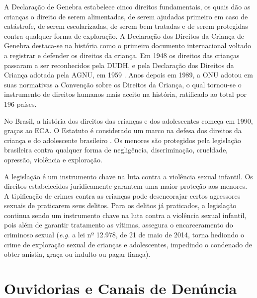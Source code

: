 A Declaração de Genebra estabelece cinco direitos fundamentais, os quais dão as crianças o direito de serem alimentadas, de serem ajudadas primeiro em caso de catástrofe, de serem escolarizadas, de serem bem tratadas e de serem protegidas contra qualquer forma de exploração. A Declaração dos Direitos da Criança de Genebra destaca-se na história como o primeiro documento internacional voltado a registrar e defender os direitos da criança. Em 1948 os direitos das crianças passaram a ser reconhecidos pela \ac{DUDH}, e pela Declaração dos Direitos da Criança adotada pela \ac{AGNU}, em 1959 \cite{lelis2014fragmentaccao}. Anos depois em 1989, a \ac{ONU} adotou em suas normativas a Convenção sobre os Direitos da Criança, o qual tornou-se o instrumento de direitos humanos mais aceito na história, ratificado ao total por 196 países. 

No Brasil, a história dos direitos das crianças e dos adolescentes começa em 1990, graças ao \acf{ECA}. O Estatuto é considerado um marco na defesa dos direitos da criança e do adolescente brasileiro \cite{lima2012direitos}. Os menores são protegidos pela legislação brasileira contra qualquer forma de negligência, discriminação, crueldade, opressão, violência e exploração. 

A legislação é um instrumento chave na luta contra a violência sexual infantil. Os direitos estabelecidos juridicamente garantem uma maior proteção aos menores. A tipificação de crimes contra as crianças pode desencorajar certos agressores sexuais de praticarem seus delitos. Para os delitos já praticados, a legislação continua sendo um instrumento chave na luta contra a violência sexual infantil, pois além de garantir tratamento as vítimas, assegura o encarceramento do criminoso sexual (\textit{e.g.} a lei nº 12.978, de 21 de maio de 2014, torna hediondo o crime de exploração sexual de crianças e adolescentes, impedindo o condenado de obter anistia, graça ou indulto ou pagar fiança).


\section{Ouvidorias e Canais de Denúncia}\label{sec:canais}

